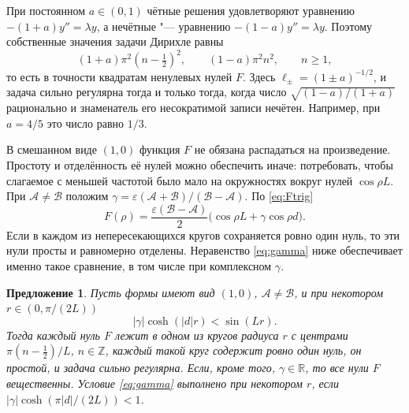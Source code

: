 \documentclass[12pt,a4paper]{article}
\numberwithin{equation}{section}
\newtheorem{proposition}{Предложение}
\theoremstyle{definition}
\newcommand{\R}{\mathbb R}
\newcommand{\abs}[1]{\lvert#1\rvert}
\begin{document}
При постоянном $a\in(0,1)$ чётные решения удовлетворяют уравнению
$-(1+a)y''=\lambda y$, а нечётные "--- уравнению $-(1-a)y''=\lambda y$.
Поэтому собственные значения задачи Дирихле равны
\[
 (1+a)\pi^2(n-\tfrac12)^2,\qquad (1-a)\pi^2n^2,\qquad n\ge1,
\]
то есть в точности квадратам ненулевых нулей $F$. Здесь $\ell_\pm=(1\pm a)^{-1/2}$,
и задача сильно регулярна тогда и только тогда, когда число
$\sqrt{(1-a)/(1+a)}$ рационально и знаменатель его несократимой записи нечётен.
Например, при $a=4/5$ это число равно $1/3$.

В смешанном виде $(1,0)$ функция $F$ не обязана распадаться на произведение.
Простоту и отделённость её нулей можно обеспечить иначе: потребовать, чтобы
слагаемое с меньшей частотой было мало на окружностях вокруг нулей
$\cos\rho L$. При $\mathcal A\ne\mathcal B$ положим
$\gamma=\varepsilon(\mathcal A+\mathcal B)/(\mathcal B-\mathcal A)$. По \eqref{eq:Ftrig}
\[
 F(\rho)=\frac{\varepsilon(\mathcal B-\mathcal A)}2\bigl(\cos\rho L+\gamma\cos\rho d\bigr).
\]
Если в каждом из непересекающихся кругов сохраняется ровно один нуль,
то эти нули просты и равномерно отделены. Неравенство \eqref{eq:gamma}
ниже обеспечивает именно такое сравнение, в том числе при комплексном $\gamma$.

\begin{proposition}\label{prop:10}
Пусть формы имеют вид $(1,0)$, $\mathcal A\ne\mathcal B$, и при некотором $r\in(0,\pi/(2L))$
\begin{equation}\label{eq:gamma}
 \abs\gamma\cosh(\abs dr)<\sin(Lr).
\end{equation}
Тогда каждый нуль $F$ лежит в одном из кругов радиуса $r$ с центрами $\pi(n-\frac12)/L$,
$n\in\mathbb Z$, каждый такой круг содержит ровно один нуль, он простой, и задача сильно
регулярна. Если, кроме того, $\gamma\in\R$, то все нули $F$ вещественны. Условие \eqref{eq:gamma}
выполнено при некотором $r$, если $\abs\gamma\cosh(\pi\abs d/(2L))<1$.
\end{proposition}
\end{document}
